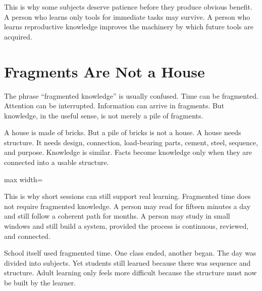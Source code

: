 This is why some subjects deserve patience before they produce obvious benefit. A person who learns only tools for immediate tasks may survive. A person who learns reproductive knowledge improves the machinery by which future tools are acquired.

\section*{Fragments Are Not a House}

The phrase ``fragmented knowledge'' is usually confused. Time can be fragmented. Attention can be interrupted. Information can arrive in fragments. But knowledge, in the useful sense, is not merely a pile of fragments.

A house is made of bricks. But a pile of bricks is not a house. A house needs structure. It needs design, connection, load-bearing parts, cement, steel, sequence, and purpose. Knowledge is similar. Facts become knowledge only when they are connected into a usable structure.

\begin{center}
\begin{adjustbox}{max width=\linewidth}
\end{adjustbox}
\end{center}

This is why short sessions can still support real learning. Fragmented time does not require fragmented knowledge. A person may read for fifteen minutes a day and still follow a coherent path for months. A person may study in small windows and still build a system, provided the process is continuous, reviewed, and connected.

School itself used fragmented time. One class ended, another began. The day was divided into subjects. Yet students still learned because there was sequence and structure. Adult learning only feels more difficult because the structure must now be built by the learner.

